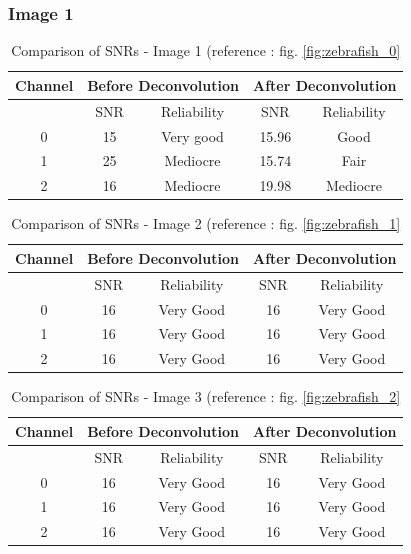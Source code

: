\documentclass{article}
\begin{document}
\subsubsection*{Image 1}
\begin{table}[h!]
\centering
\caption{Comparison of SNRs - Image 1 (reference : fig. \ref{fig:zebrafish_0}}
\begin{tabular}{*5c}
\toprule
Channel &  \multicolumn{2}{c}{Before Deconvolution} & \multicolumn{2}{c}{After Deconvolution}\\
\midrule
{}   & SNR   & Reliability    & SNR   & Reliability \\
0   &  15 & Very good   & 15.96  & Good\\
1   &  25 & Mediocre & 15.74  & Fair\\
2   &  16  &  Mediocre & 19.98  & Mediocre\\
\bottomrule
\end{tabular}
\end{table}
\begin{table}[h!]
\centering
\caption{Comparison of SNRs - Image 2 (reference : fig. \ref{fig:zebrafish_1}}
\begin{tabular}{*5c}
\toprule
Channel &  \multicolumn{2}{c}{Before Deconvolution} & \multicolumn{2}{c}{After Deconvolution}\\
\midrule
{}   & SNR   & Reliability    & SNR   & Reliability \\
0   &  16 & Very Good & 16 & Very Good \\
1   &  16 & Very Good & 16 & Very Good \\
2   &  16 & Very Good & 16 & Very Good \\
\bottomrule
\end{tabular}
\end{table}
\begin{table}[h!]
\centering
\caption{Comparison of SNRs - Image 3 (reference : fig. \ref{fig:zebrafish_2}}
\begin{tabular}{*5c}
\toprule
Channel &  \multicolumn{2}{c}{Before Deconvolution} & \multicolumn{2}{c}{After Deconvolution}\\
\midrule
{}   & SNR   & Reliability    & SNR   & Reliability \\
0   &  16 & Very Good & 16 & Very Good \\
1   &  16 & Very Good & 16 & Very Good \\
2   &  16 & Very Good & 16 & Very Good \\
\bottomrule
\end{tabular}
\end{table}
\end{document}
